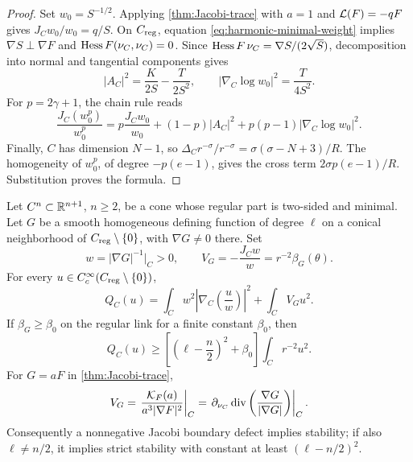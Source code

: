 \begin{proof}
Set \(w_0=S^{-1/2}\). Applying \cref{thm:Jacobi-trace} with
\(a=1\) and \(\mathcal L(F)=-qF\) gives \(J_Cw_0/w_0=q/S\).
On \(C_{\mathrm{reg}}\), equation \eqref{eq:harmonic-minimal-weight} implies
\(\nabla S\perp\nabla F\) and \(\operatorname{Hess} F(\nu_C,\nu_C)=0\).
Since \(\operatorname{Hess} F\,\nu_C=\nabla S/(2\sqrt S)\), decomposition into
normal and tangential components gives
\[
 |A_C|^2=\frac{K}{2S}-\frac{T}{2S^2},\qquad
 |\nabla_C\log w_0|^2=\frac{T}{4S^2}.
\]
For \(p=2\gamma+1\), the chain rule reads
\[
 \frac{J_C(w_0^p)}{w_0^p}
 =p\frac{J_Cw_0}{w_0}+(1-p)|A_C|^2
       +p(p-1)|\nabla_C\log w_0|^2.
\]
Finally, \(C\) has dimension \(N-1\), so
\(\Delta_Cr^{-\sigma}/r^{-\sigma}
 =\sigma(\sigma-N+3)/R\).
The homogeneity of \(w_0^p\), of degree \(-p(e-1)\), gives the
cross term \(2\sigma p(e-1)/R\). Substitution proves the formula.
\end{proof}

\begin{theorem}
\label{thm:ground-state-gap}
Let \(C^n\subset\mathbb R^{n+1}\), \(n\geq2\), be a cone whose regular part
is two-sided and minimal.  Let \(G\) be a smooth homogeneous defining function of degree
\(\ell\) on a conical neighborhood of \(C_{\mathrm{reg}}\setminus\{0\}\), with
\(\nabla G\neq0\) there.  Set
\begin{equation}\label{eq:boundary-Jacobi-potential}
 w=|\nabla G|^{-1}\big|_C>0,\qquad
 V_G=-\frac{J_Cw}{w}=r^{-2}\beta_G(\theta).
\end{equation}
For every \(u\in C_c^\infty(C_{\mathrm{reg}}\setminus\{0\})\),
\begin{equation}\label{eq:ground-state-identity}
 Q_C(u)=\int_Cw^2\left|\nabla_C\left(\frac uw\right)\right|^2
             +\int_CV_Gu^2.
\end{equation}
If \(\beta_G\geq\beta_0\) on the regular link for a finite constant \(\beta_0\), then
\begin{equation}\label{eq:homogeneous-strict-stability}
 Q_C(u)\geq\left[\left(\ell-\frac n2\right)^2+\beta_0\right]
                  \int_Cr^{-2}u^2.
\end{equation}
For \(G=aF\) in \cref{thm:Jacobi-trace},
\begin{equation}\label{eq:boundary-potential-algebraic}
 V_G=\left.\frac{\mathcal K_F(a)}{a^3|\nabla F|^2}\right|_C
     =\left.\partial_{\nu_C}\operatorname{div}
          \left(\frac{\nabla G}{|\nabla G|}\right)\right|_C.
\end{equation}
Consequently a nonnegative Jacobi boundary defect implies stability;
if also \(\ell\neq n/2\), it implies strict stability with constant at
least \((\ell-n/2)^2\).
\end{theorem}

